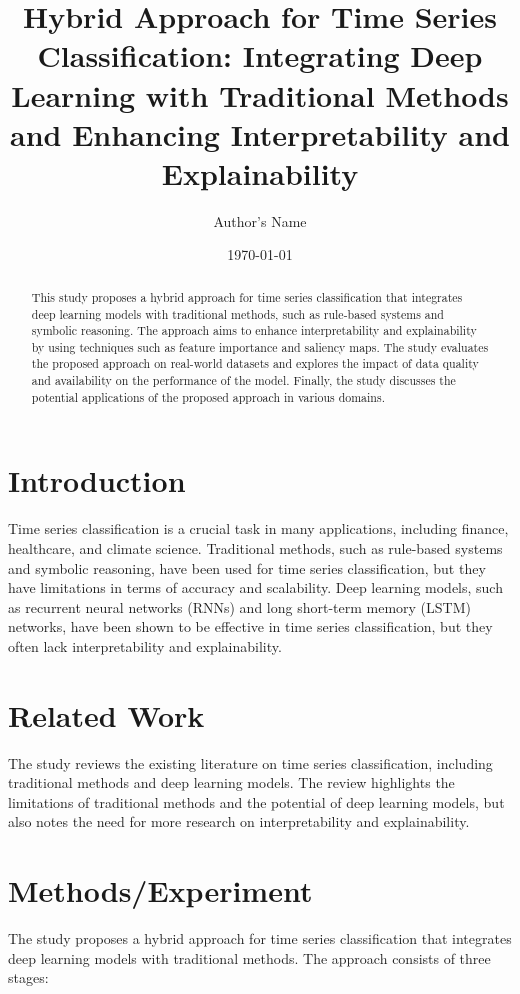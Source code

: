 \documentclass{article}
\title{Hybrid Approach for Time Series Classification: Integrating Deep Learning with Traditional Methods and Enhancing Interpretability and Explainability}
\author{Author's Name}
\date{\today}
\begin{document}
\maketitle

\begin{abstract}
This study proposes a hybrid approach for time series classification that integrates deep learning models with traditional methods, such as rule-based systems and symbolic reasoning. The approach aims to enhance interpretability and explainability by using techniques such as feature importance and saliency maps. The study evaluates the proposed approach on real-world datasets and explores the impact of data quality and availability on the performance of the model. Finally, the study discusses the potential applications of the proposed approach in various domains.
\end{abstract}

\section{Introduction}

Time series classification is a crucial task in many applications, including finance, healthcare, and climate science. Traditional methods, such as rule-based systems and symbolic reasoning, have been used for time series classification, but they have limitations in terms of accuracy and scalability. Deep learning models, such as recurrent neural networks (RNNs) and long short-term memory (LSTM) networks, have been shown to be effective in time series classification, but they often lack interpretability and explainability.

\section{Related Work}

The study reviews the existing literature on time series classification, including traditional methods and deep learning models. The review highlights the limitations of traditional methods and the potential of deep learning models, but also notes the need for more research on interpretability and explainability.

\section{Methods/Experiment}

The study proposes a hybrid approach for time series classification that integrates deep learning models with traditional methods. The approach consists of three stages:
\end{document}
